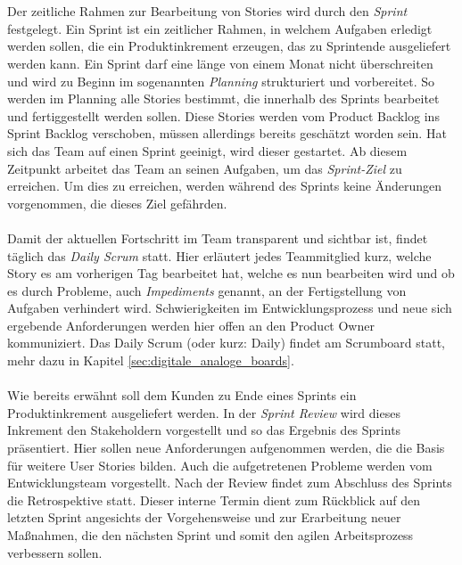 \\ \\
Der zeitliche Rahmen zur Bearbeitung von Stories wird durch den \textit{Sprint} festgelegt. Ein Sprint ist ein zeitlicher Rahmen, in welchem Aufgaben erledigt werden sollen, die ein Produktinkrement erzeugen, das zu Sprintende ausgeliefert werden kann. Ein Sprint darf eine länge von einem Monat nicht überschreiten und wird zu Beginn im sogenannten \textit{Planning} strukturiert und vorbereitet. So werden im Planning alle Stories bestimmt, die innerhalb des Sprints bearbeitet und fertiggestellt werden sollen. Diese Stories werden vom Product Backlog ins Sprint Backlog verschoben, müssen allerdings bereits geschätzt worden sein. Hat sich das Team auf einen Sprint geeinigt, wird dieser gestartet. Ab diesem Zeitpunkt arbeitet das Team an seinen Aufgaben, um das \textit{Sprint-Ziel} zu erreichen. Um dies zu erreichen, werden während des Sprints keine Änderungen vorgenommen, die dieses Ziel gefährden. 
\\ \\
Damit der aktuellen Fortschritt im Team transparent und sichtbar ist, findet täglich das \textit{Daily Scrum} statt. Hier erläutert jedes Teammitglied kurz, welche Story es am vorherigen Tag bearbeitet hat, welche es nun bearbeiten wird und ob es durch Probleme, auch \textit{Impediments} genannt, an der Fertigstellung von Aufgaben verhindert wird. Schwierigkeiten im Entwicklungsprozess und neue sich ergebende Anforderungen werden hier offen an den Product Owner kommuniziert. Das Daily Scrum (oder kurz: Daily) findet am Scrumboard statt, mehr dazu in Kapitel \ref{sec:digitale_analoge_boards}.
\\ \\ 
Wie bereits erwähnt soll dem Kunden zu Ende eines Sprints ein Produktinkrement ausgeliefert werden. In der \textit{Sprint Review} wird dieses Inkrement den Stakeholdern vorgestellt und so das Ergebnis des Sprints präsentiert. Hier sollen neue Anforderungen aufgenommen werden, die die Basis für weitere User Stories bilden. Auch die aufgetretenen Probleme werden vom Entwicklungsteam vorgestellt. Nach der Review findet zum Abschluss des Sprints die Retrospektive statt. Dieser interne Termin dient zum Rückblick auf den letzten Sprint angesichts der Vorgehensweise und zur Erarbeitung neuer Maßnahmen, die den nächsten Sprint und somit den agilen Arbeitsprozess verbessern sollen.

